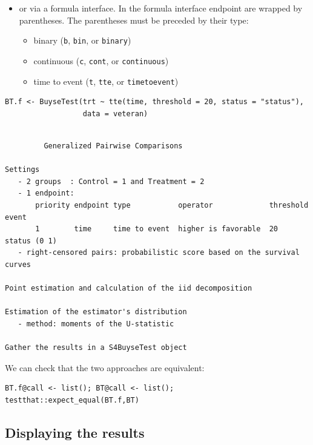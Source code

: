 \documentclass[12pt]{article}
\begin{document}
\clearpage

\begin{itemize}
\item or via a formula interface. In the formula interface endpoint are
wrapped by parentheses. The parentheses must be preceded by their
type: 
\begin{itemize}[label={-}]
\item binary (\texttt{b}, \texttt{bin}, or \texttt{binary})
\item continuous (\texttt{c}, \texttt{cont}, or  \texttt{continuous})
\item time to event (\texttt{t}, \texttt{tte}, or \texttt{timetoevent})
\end{itemize}
\end{itemize}

\lstset{language=r,label= ,caption= ,captionpos=b,numbers=none}
\begin{lstlisting}
BT.f <- BuyseTest(trt ~ tte(time, threshold = 20, status = "status"),
                  data = veteran)
\end{lstlisting}

\begin{verbatim}

         Generalized Pairwise Comparisons

Settings 
   - 2 groups  : Control = 1 and Treatment = 2
   - 1 endpoint: 
       priority endpoint type           operator             threshold event       
       1        time     time to event  higher is favorable  20        status (0 1)
   - right-censored pairs: probabilistic score based on the survival curves 

Point estimation and calculation of the iid decomposition

Estimation of the estimator's distribution 
   - method: moments of the U-statistic

Gather the results in a S4BuyseTest object
\end{verbatim}

We can check that the two approaches are equivalent:
\lstset{language=r,label= ,caption= ,captionpos=b,numbers=none}
\begin{lstlisting}
BT.f@call <- list(); BT@call <- list();
testthat::expect_equal(BT.f,BT)
\end{lstlisting}

\subsection{Displaying the results}
\label{sec:orgafa820f}
\end{document}
